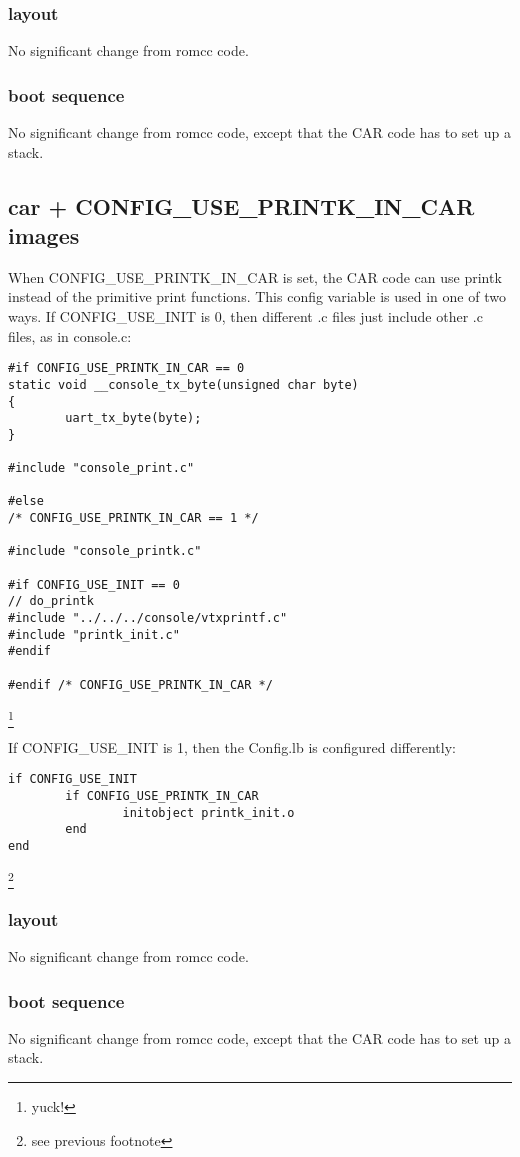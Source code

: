 \documentclass[titlepage,12pt]{article}
\begin{document}
\subsubsection{layout}
No significant change from romcc code. 
\subsubsection{boot sequence}
No significant change from romcc code, except that the CAR code has to set up a stack. 
\subsection{car + CONFIG\_USE\_PRINTK\_IN\_CAR images}
When CONFIG\_USE\_PRINTK\_IN\_CAR is set, the CAR code can use printk instead of the primitive print functions. This config variable is used in one of two ways. If CONFIG\_USE\_INIT is 0, then different .c files just include other .c files, as in console.c: 
\begin{verbatim}
#if CONFIG_USE_PRINTK_IN_CAR == 0
static void __console_tx_byte(unsigned char byte)
{
        uart_tx_byte(byte);
}

#include "console_print.c"

#else
/* CONFIG_USE_PRINTK_IN_CAR == 1 */

#include "console_printk.c"

#if CONFIG_USE_INIT == 0
// do_printk
#include "../../../console/vtxprintf.c"
#include "printk_init.c"
#endif

#endif /* CONFIG_USE_PRINTK_IN_CAR */

\end{verbatim}\footnote{yuck!} 

If CONFIG\_USE\_INIT is 1, then the Config.lb is configured differently: 
\begin{verbatim}
if CONFIG_USE_INIT
        if CONFIG_USE_PRINTK_IN_CAR
                initobject printk_init.o
        end
end

\end{verbatim}\footnote{see previous footnote} 

\subsubsection{layout}
No significant change from romcc code. 
\subsubsection{boot sequence}
No significant change from romcc code, except that the CAR code has to set up a stack. 
\end{document}
